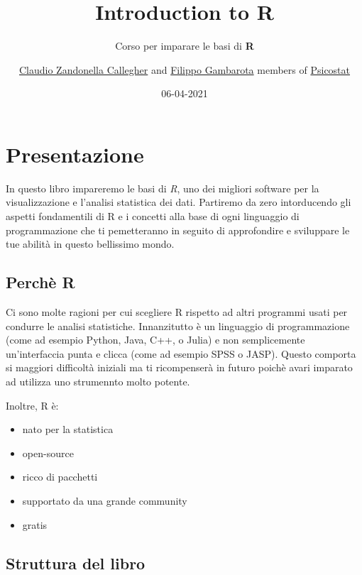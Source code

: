 \documentclass[
]{book}
\title{{Introduction to R}}
\subtitle{Corso per imparare le basi di \textbf{R}}
\author{\href{https://claudiozandonella.netlify.app/}{Claudio Zandonella Callegher} and \href{https://filippogambarota.netlify.app/}{Filippo Gambarota} members of \href{https://psicostat.dpss.psy.unipd.it/}{Psicostat}}
\date{06-04-2021}
\providecommand{\tightlist}{%
  \setlength{\itemsep}{0pt}\setlength{\parskip}{0pt}}
\begin{document}
\maketitle

{
\setcounter{tocdepth}{1}
\tableofcontents
}
\hypertarget{presentazione}{%
\chapter*{Presentazione}\label{presentazione}}

In questo libro impareremo le basi di \emph{R}, uno dei migliori software per la visualizzazione e l'analisi statistica dei dati. Partiremo da zero intorducendo gli aspetti fondamentili di R e i concetti alla base di ogni linguaggio di programmazione che ti pemetteranno in seguito di approfondire e sviluppare le tue abilità in questo bellissimo mondo.

\hypertarget{perchuxe8-r}{%
\section*{Perchè R}\label{perchuxe8-r}}

Ci sono molte ragioni per cui scegliere R rispetto ad altri programmi usati per condurre le analisi statistiche. Innanzitutto è un linguaggio di programmazione (come ad esempio Python, Java, C++, o Julia) e non semplicemente un'interfaccia punta e clicca (come ad esempio SPSS o JASP). Questo comporta si maggiori difficoltà iniziali ma ti ricompenserà in futuro poichè avari imparato ad utilizza uno strumennto molto potente.

Inoltre, R è:

\begin{itemize}
\tightlist
\item
  nato per la statistica
\item
  open-source
\item
  ricco di pacchetti
\item
  supportato da una grande community
\item
  gratis
\end{itemize}

\hypertarget{struttura-del-libro}{%
\section*{Struttura del libro}\label{struttura-del-libro}}
\end{document}
